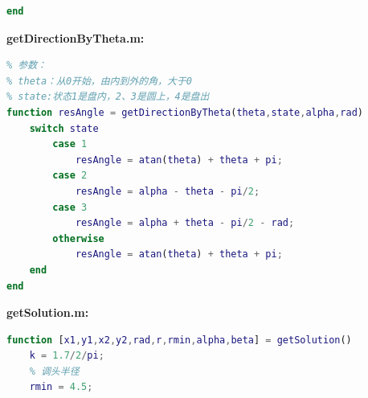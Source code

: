 \documentclass[withoutpreface,bwprint]{cumcmthesis} %
\begin{document}
\begin{appendices}
\begin{lstlisting}[language=matlab]
end
\end{lstlisting}
\noindent\textbf{\textcolor[rgb]{0.98,0.00,0.00}{getDirectionByTheta.m:}}
\begin{lstlisting}[language=matlab]
% 通过theta角计算当前速度方向与x轴正方向的夹角
% 参数：
% theta：从0开始，由内到外的角，大于0
% state:状态1是盘内，2、3是圆上，4是盘出
function resAngle = getDirectionByTheta(theta,state,alpha,rad)
    switch state
        case 1
            resAngle = atan(theta) + theta + pi;
        case 2
            resAngle = alpha - theta - pi/2;
        case 3
            resAngle = alpha + theta - pi/2 - rad;
        otherwise
            resAngle = atan(theta) + theta + pi;
    end
end
\end{lstlisting}
\noindent\textbf{\textcolor[rgb]{0.98,0.00,0.00}{getSolution.m:}}
\begin{lstlisting}[language=matlab]
function [x1,y1,x2,y2,rad,r,rmin,alpha,beta] = getSolution()
    k = 1.7/2/pi;
    % 调头半径
    rmin = 4.5;
    

\end{lstlisting}
\end{appendices}
\end{document}
